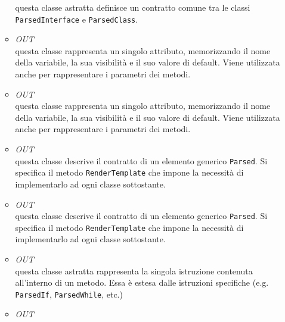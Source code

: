 \begin{itemize}
\begin{itemize}
questa classe astratta definisce un contratto comune tra le classi \texttt{ParsedInterface} e \texttt{ParsedClass}. 
\item \textit{OUT} \hyperref[\nogloxy{swedesigner::server::project::ParsedAttribute}]{}\\
questa classe rappresenta un singolo attributo, memorizzando il nome della variabile, la sua visibilità e il suo valore di default. Viene utilizzata anche per rappresentare i parametri dei metodi.
\item \textit{OUT} \hyperref[\nogloxy{swedesigner::server::project::ParsedAttribute}]{}\\
questa classe rappresenta un singolo attributo, memorizzando il nome della variabile, la sua visibilità e il suo valore di default. Viene utilizzata anche per rappresentare i parametri dei metodi.
\item \textit{OUT} \hyperref[\nogloxy{swedesigner::server::project::ParsedElement}]{}\\
questa classe descrive il contratto di un elemento generico \texttt{Parsed}. Si specifica il metodo \texttt{RenderTemplate} che impone la necessità di implementarlo ad ogni classe sottostante.
\item \textit{OUT} \hyperref[\nogloxy{swedesigner::server::project::ParsedElement}]{}\\
questa classe descrive il contratto di un elemento generico \texttt{Parsed}. Si specifica il metodo \texttt{RenderTemplate} che impone la necessità di implementarlo ad ogni classe sottostante.
\item \textit{OUT} \hyperref[\nogloxy{swedesigner::server::project::ParsedInstruction}]{}\\
questa classe astratta rappresenta la singola istruzione contenuta all'interno di un metodo. Essa è estesa dalle istruzioni specifiche (e.g. \texttt{ParsedIf}, \texttt{ParsedWhile}, etc.)
\item \textit{OUT} \hyperref[\nogloxy{swedesigner::server::project::ParsedInstruction}]{}\\

\end{itemize}
\end{itemize}
